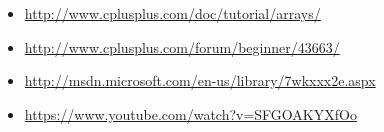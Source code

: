 
\begin{itemize}
\item \url{http://www.cplusplus.com/doc/tutorial/arrays/}
\item \url{http://www.cplusplus.com/forum/beginner/43663/}
\item \url{http://msdn.microsoft.com/en-us/library/7wkxxx2e.aspx}
\item \url{https://www.youtube.com/watch?v=SFGOAKYXfOo}
\end{itemize}	